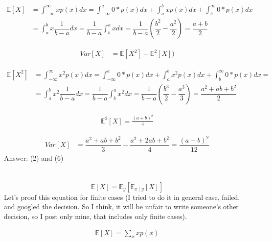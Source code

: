 \documentclass[11pt]{article}
\newcommand{\exercise}{\section{}}
\begin{document}
\begin{equation}
\begin{split}
\mathbb{E}[X] &= \int^{\infty}_{-\infty}{xp(x)dx} = \int^{a}_{-\infty}{0*p(x)dx} + \int^{b}_{a}{xp(x)dx} + \int^{\infty}_{b}{0*p(x)dx} \\
&= \int^{b}_{a}{x\dfrac{1}{b-a}dx} = \dfrac{1}{b-a}\int^{a}_{b}{xdx} = \dfrac{1}{b-a}(\dfrac{b^2}{2} - \dfrac{a^2}{2}) = \dfrac{a+b}{2}
\end{split}
\end{equation}

\begin{equation}
\begin{split}
Var[X] &= \mathbb{E}[X^2] - \mathbb{E}^2[X]) 
\end{split}
\end{equation}

\begin{equation}
\begin{split}
\mathbb{E}[X^2] &= \int^{\infty}_{-\infty}{x^2p(x)dx} = \int^{a}_{-\infty}{0*p(x)dx} + \int^{b}_{a}{x^2p(x)dx} + \int^{\infty}_{b}{0*p(x)dx} = \\
&= \int^{b}_{a}{x^2\dfrac{1}{b-a}dx} = \dfrac{1}{b-a}\int^{a}_{b}{x^2dx} = \dfrac{1}{b-a}(\dfrac{b^3}{2} - \dfrac{a^3}{3}) = \dfrac{a^2+ab+b^2}{2}
\end{split}
\end{equation}

\begin{equation}
\begin{split}
\mathbb{E}^2[X] = \frac{(a+b)^2}{4}
\end{split}
\end{equation}

\begin{equation}
\begin{split}
Var[X] &= \dfrac{a^2+ab+b^2}{3} - \dfrac{a^2+2ab+b^2}{4} = \dfrac{(a - b)^2}{12}
\end{split}
\end{equation}
Answer: (2) and (6)


\exercise
$$\mathbb{E}[X] = \mathbb{E}_{y}[\mathbb{E}_{x\mid y}[X]]$$
Let's proof this equation for finite cases (I tried to do it in general case, failed, and googled the decision. So I think, it will be unfair to write someone's other decision, so I post only mine, that includes only finite cases).

\begin{equation}
\begin{split}
\mathbb{E}[X] = \sum_{x}xp(x)
\end{split}
\end{equation}
\end{document}

